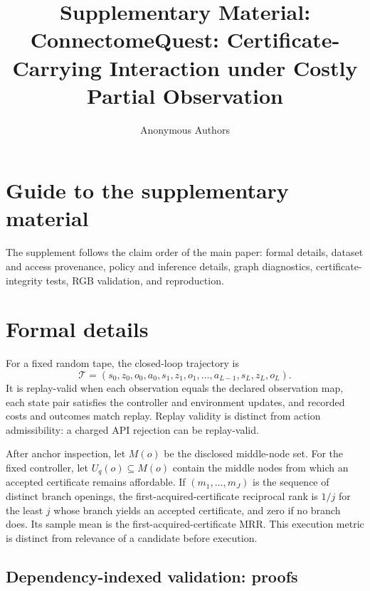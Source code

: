 \documentclass{article}
\title{Supplementary Material: ConnectomeQuest: Certificate-Carrying Interaction under Costly Partial Observation}
\author{Anonymous Authors}
\begin{document}
\maketitle
\appendix

\section*{Guide to the supplementary material}

The supplement follows the claim order of the main paper: formal details,
dataset and access provenance, policy and inference details, graph diagnostics,
certificate-integrity tests, RGB validation, and reproduction.

\renewcommand{\thesection}{C\arabic{section}}
\renewcommand{\theHsection}{core.\arabic{section}}

\section{Formal details}
\label{app:formal-foundations}

For a fixed random tape, the closed-loop trajectory is
\[
 \mathcal T=(s_0,z_0,o_0,a_0,s_1,z_1,o_1,\ldots,a_{L-1},s_L,z_L,o_L).
\]
It is replay-valid when each observation equals the declared observation map,
each state pair satisfies the controller and environment updates, and recorded
costs and outcomes match replay. Replay validity is distinct from action
admissibility: a charged API rejection can be replay-valid.

After anchor inspection, let $M(o)$ be the disclosed middle-node set. For the
fixed controller, let $U_q(o)\subseteq M(o)$ contain the middle nodes from which
an accepted certificate remains affordable. If
$(m_1,\ldots,m_J)$ is the sequence of distinct branch openings, the
first-acquired-certificate reciprocal rank is $1/j$ for the least $j$ whose
branch yields an accepted certificate, and zero if no branch does. Its sample
mean is the first-acquired-certificate MRR. This execution metric is distinct
from relevance of a candidate before execution.


\subsection{Dependency-indexed validation: proofs}
\label{app:receipt-proofs}
\end{document}
